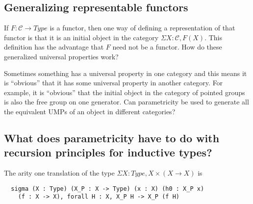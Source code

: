 \documentclass[12pt]{article} %
\theoremstyle{definition}
\theoremstyle{definition}
\theoremstyle{definition}
\theoremstyle{definition}
\begin{document}
\subsection{Generalizing representable functors}
If $F : \mathcal{C} \rightarrow Type$ is a functor, then one way of defining a representation
of that functor is that it is an initial object in the category $\Sigma X : \mathcal{C}, F(X)$.
This definition has the advantage that $F$ need not be a functor. How do these generalized 
universal properties work?

Sometimes something has a universal property in one category and this means it is ``obvious'' that 
it has some universal property in another category. For example, it is ``obvious'' that the initial
object in the category of pointed groups is also the free group on one generator. Can parametricity be used 
to generate all the equivalent UMPs of an object in different categories?

\subsection {What does parametricity have to do with recursion principles for inductive types?}

The arity one translation of the type $\Sigma X : Type, X \times (X \rightarrow X)$ is 
\begin{lstlisting}
  sigma (X : Type) (X_P : X -> Type) (x : X) (h0 : X_P x) 
    (f : X -> X), forall H : X, X_P H -> X_P (f H)
\end{lstlisting}






\end{document}
